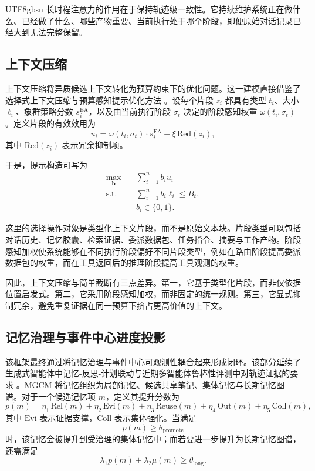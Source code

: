 \documentclass[a4paper,fleqn]{cas-sc}
\begin{document}
\begin{CJK*}{UTF8}{gbsn}
长时程注意力的作用在于保持轨迹级一致性。它持续维护系统正在做什么、已经做了什么、哪些产物重要、当前执行处于哪个阶段，即便原始对话记录已经大到无法完整保留。

\subsection{上下文压缩}

上下文压缩将异质候选上下文转化为预算约束下的优化问题。这一建模直接借鉴了选择式上下文压缩与预算感知提示优化方法 \citep{li2023selectivecontext,jiang2023llmlingua}。设每个片段 $z_i$ 都具有类型 $t_i$、大小 $\ell_i$、象群策略分数 $s_i^{\text{EA}}$，以及由当前执行阶段 $\sigma_t$ 决定的阶段感知权重 $\omega(t_i, \sigma_t)$。定义片段的有效效用为
\begin{equation}
u_i = \omega(t_i, \sigma_t) \cdot s_i^{\text{EA}} - \xi \, \mathrm{Red}(z_i),
\end{equation}
其中 $\mathrm{Red}(z_i)$ 表示冗余抑制项。

于是，提示构造可写为
\begin{align}
\max_{\bm{b}} \quad & \sum_{i=1}^{n} b_i u_i \\
\text{s.t.} \quad & \sum_{i=1}^{n} b_i \ell_i \leq B_t, \\
& b_i \in \{0,1\}.
\end{align}

这里的选择操作对象是类型化上下文片段，而不是原始文本块。片段类型可以包括对话历史、记忆胶囊、检索证据、委派数据包、任务指令、摘要与工作产物。阶段感知加权使系统能够在不同执行阶段偏好不同片段类型，例如在路由阶段提高委派数据包的权重，而在工具返回后的推理阶段提高工具观测的权重。

因此，上下文压缩与简单截断有三点差异。第一，它基于类型化片段，而非仅依据位置启发式。第二，它采用阶段感知加权，而非固定的统一规则。第三，它显式抑制冗余，避免重复证据在同一预算下挤占更高价值的上下文。

\subsection{记忆治理与事件中心进度投影}

该框架最终通过将记忆治理与事件中心可观测性耦合起来形成闭环。该部分延续了生成式智能体中记忆-反思-计划联动与近期多智能体鲁棒性评测中对轨迹证据的要求 \citep{park2023generative,dong2026pear}。MGCM 将记忆组织为局部记忆、候选共享笔记、集体记忆与长期记忆图谱。对于一个候选记忆项 $m$，定义其提升分数为
\begin{equation}
p(m) = \eta_1 \, \mathrm{Rel}(m) + \eta_2 \, \mathrm{Evi}(m) + \eta_3 \, \mathrm{Reuse}(m) + \eta_4 \, \mathrm{Out}(m) + \eta_5 \, \mathrm{Coll}(m),
\end{equation}
其中 $\mathrm{Evi}$ 表示证据支撑，$\mathrm{Coll}$ 表示集体强化。当满足
\begin{equation}
p(m) \geq \theta_{\text{promote}}
\end{equation}
时，该记忆会被提升到受治理的集体记忆中；而若要进一步提升为长期记忆图谱，还需满足
\begin{equation}
\lambda_1 p(m) + \lambda_2 \mu(m) \geq \theta_{\text{long}}.
\end{equation}


\end{CJK*}
\end{document}
